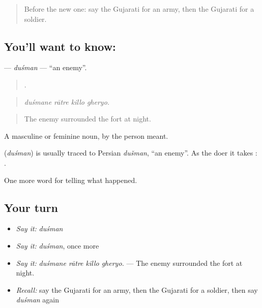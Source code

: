 \label{lesson:GU-C320-dusman}



\begin{quote}
Before the new one: say the Gujarati for an army, then the Gujarati for a soldier.
\end{quote}

\subsection*{You'll want to know: }
\textbf{} — \emph{duśman} — \textquotedblleft{}an enemy\textquotedblright{}.

\begin{quote}
   .
\end{quote}

\begin{quote}
\emph{duśmane rātre killo gheryo.}
\end{quote}

\begin{quote}
The enemy surrounded the fort at night.
\end{quote}

A masculine or feminine noun, by the person meant.

\begin{cousinweb}
\textbf{} (\emph{duśman}) is usually traced to Persian \emph{dušman}, \textquotedblleft{}an enemy\textquotedblright{}. As the doer it takes \textbf{}: \textbf{  }.
\end{cousinweb}

\begin{grammarlens}[title={What you've built}]
One more word for telling what happened.
\end{grammarlens}

\subsection*{Your turn}
\begin{itemize}
\raggedright
  \item \emph{Say it:} \emph{duśman}
  \item \emph{Say it:} \emph{duśman}, once more
  \item \emph{Say it:} \emph{duśmane rātre killo gheryo.} — The enemy surrounded the fort at night.
  \item \emph{Recall:} say the Gujarati for an army, then the Gujarati for a soldier, then say \emph{duśman} again
\end{itemize}

